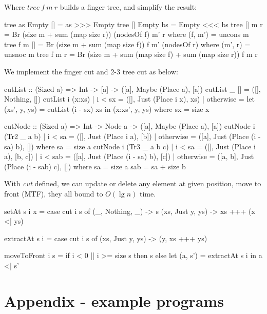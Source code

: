 \documentclass[b5paper]{article}
\begin{document}
\begin{Answer}
{Where $tree\ f\ m\ r$ builds a finger tree, and simplify the result:

\begin{Haskell}
tree as Empty [] = as >>> Empty
tree [] Empty bs = Empty <<< bs
tree [] m r = Br (size m + sum (map size r)) (nodesOf f) m' r
    where (f, m') = uncons m
tree f m [] = Br (size m + sum (map size f)) f m' (nodesOf r)
    where (m', r) = unsnoc m
tree f m r = Br (size m + sum (map size f) + sum (map size r)) f m r
\end{Haskell}

We implement the finger cut and 2-3 tree cut as below:

\begin{Haskell}
cutList :: (Sized a) => Int -> [a] -> ([a], Maybe (Place a), [a])
cutList _ [] = ([], Nothing, [])
cutList i (x:xs) | i < sx = ([], Just (Place i x), xs)
                 | otherwise = let (xs', y, ys) = cutList (i - sx) xs
                               in (x:xs', y, ys)
  where sx = size x

cutNode :: (Sized a) => Int -> Node a -> ([a], Maybe (Place a), [a])
cutNode i (Tr2 _ a b) | i < sa = ([], Just (Place i a), [b])
                      | otherwise = ([a], Just (Place (i - sa) b), [])
  where sa = size a
cutNode i (Tr3 _ a b c) | i < sa = ([], Just (Place i a), [b, c])
                        | i < sab = ([a], Just (Place (i - sa) b), [c])
                        | otherwise = ([a, b], Just (Place (i - sab) c), [])
  where sa = size a
        sab = sa + size b
\end{Haskell}

With \textit{cut} defined, we can update or delete any element at given position, move to front (MTF), they all bound to $O(\lg n)$ time.

\begin{Haskell}
setAt s i x = case cut i s of
  (_, Nothing, _) -> s
  (xs, Just y, ys) -> xs +++ (x <| ys)

extractAt s i = case cut i s of (xs, Just y, ys) -> (y, xs +++ ys)

moveToFront i s = if i < 0 || i >= size s then s
                  else let (a, s') = extractAt s i in a <| s'
\end{Haskell}
}
\end{Answer}

\section{Appendix - example programs}
\end{document}
